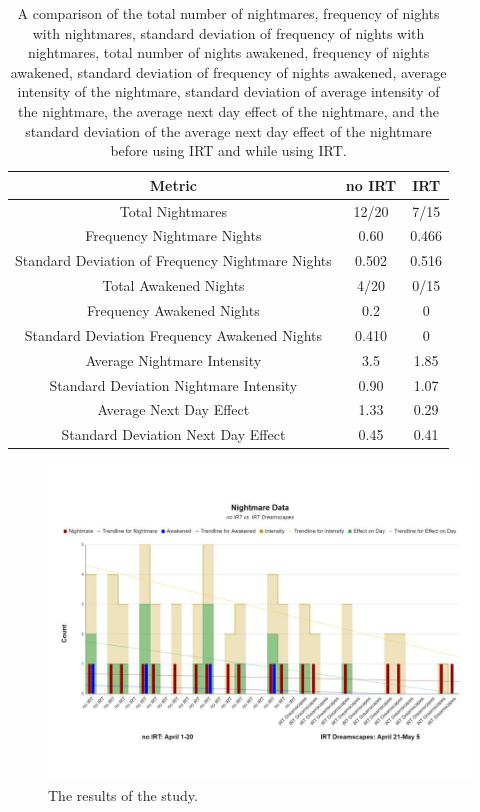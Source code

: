 \documentclass{article}
\begin{document}
\begin{table}[htbp]
\centering
\begin{tabular}{||c c c||}
 \hline
 Metric & no IRT & IRT \\
 \hline
 Total Nightmares & 12/20 & 7/15\\
 Frequency Nightmare Nights & 0.60 & 0.466 \\
 Standard Deviation of Frequency Nightmare Nights & 0.502 & 0.516 \\
 Total Awakened Nights & 4/20 & 0/15 \\
 Frequency Awakened Nights & 0.2 & 0 \\
 Standard Deviation Frequency Awakened Nights & 0.410 & 0 \\
 Average Nightmare Intensity & 3.5 & 1.85 \\
 Standard Deviation Nightmare Intensity & 0.90 & 1.07 \\
 Average Next Day Effect & 1.33 & 0.29 \\
 Standard Deviation Next Day Effect & 0.45 & 0.41 \\
 \hline
\end{tabular}
\caption{A comparison of the total number of nightmares, frequency of nights with nightmares, standard deviation of frequency of nights with nightmares, total number of nights awakened, frequency of nights awakened, standard deviation of frequency of nights awakened, average intensity of the nightmare, standard deviation of average intensity of the nightmare, the average next day effect of the nightmare, and the standard deviation of the average next day effect of the nightmare before using IRT and while using IRT.}
\label{NightmareCompare}
\end{table}

\begin{figure}[htbp]
    \centering
    \includegraphics[width=1\textwidth]{images/nightmare_data.jpg}
    \caption{The results of the study.}
    \label{fig:nightmaredata}
\end{figure}
\end{document}
